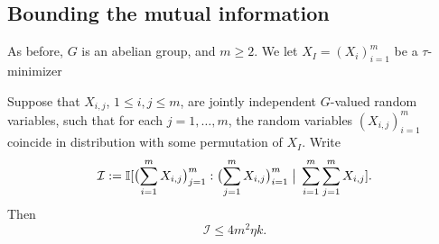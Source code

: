 \subsection{Bounding the mutual information}

As before, $G$ is an abelian group, and $m\geq 2$.  We let $X_I = (X_i)_{i =1}^m$ be a $\tau$-minimizer

\begin{proposition}\label{key}
Suppose that $X_{i,j}$, $1 \leq i,j \leq m$, are jointly independent $G$-valued random variables, such that for each $j = 1,\dots,m$, the random variables $(X_{i,j})_{i = 1}^m$ coincide in distribution with some permutation of $X_I$.
  Write
  \[
    {\mathcal I} := \mathbb{I}[ \bigl(\sum_{i=1}^m X_{i,j}\bigr)_{j =1}^{m} : \bigl(\sum_{j=1}^m X_{i,j}\bigr)_{i = 1}^m \; \big| \; \sum_{i=1}^m \sum_{j = 1}^m  X_{i,j} ].
  \]
Then
  \begin{equation}\label{I-ineq}
    {\mathcal I} \leq 4 m^2 \eta k.
  \end{equation}
\end{proposition}


